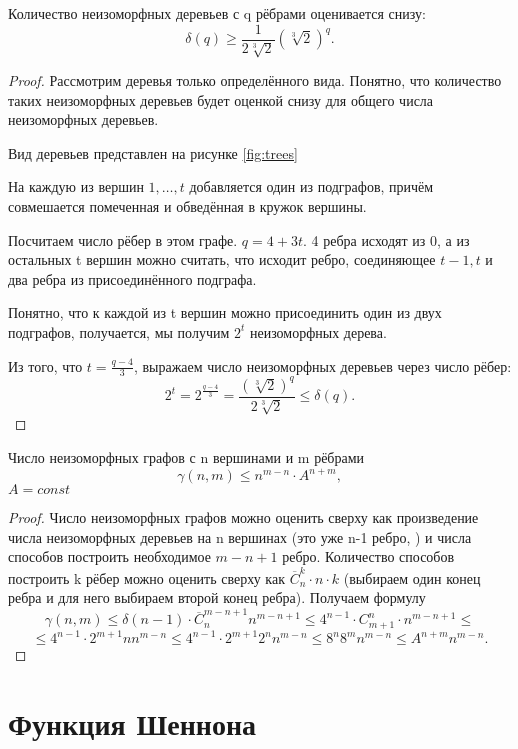 \begin{theorem}
Количество неизоморфных деревьев с q рёбрами оценивается снизу: \[
	\delta(q) \ge \frac{1}{2 \sqrt[3]{2}}\left( \sqrt[3]{2}  \right) ^q
.\] 
\end{theorem}
\begin{proof}
Рассмотрим деревья только определённого вида. Понятно, что количество таких
неизоморфных деревьев будет оценкой снизу для общего числа неизоморфных
деревьев.

Вид деревьев представлен на рисунке \ref{fig:trees}
\begin{figure*}[h!]
    \centering
    \caption{Вид дерева и присоединяемых поддеревьев.}
    \label{fig:trees}
\end{figure*}

На каждую из вершин $1,\ldots, t$ добавляется один из подграфов, причём
совмешается помеченная и обведённая в кружок вершины. 

Посчитаем число рёбер в этом графе. $q=4+3t$. 4 ребра исходят из 0, а из остальных
t вершин можно считать, что исходит ребро, соединяющее  ${t-1, t}$ и два ребра
из присоединённого подграфа.

Понятно, что к каждой из t вершин можно присоединить один из двух подграфов,
получается, мы получим $2^t$ неизоморфных дерева. 

Из того, что $t = \frac{q-4}{3}$, выражаем число неизоморфных деревьев через число рёбер: \[
	2^t = 2^{\frac{q-4}{3}} = \frac{\left( \sqrt[3]{2}  \right)^q
	}{2\sqrt[3]{2} } \le \delta(q)
.\] 
\end{proof}
\begin{theorem}
	Число неизоморфных графов с n вершинами и m рёбрами \[\gamma(n, m) \le n^{m-n} \cdot
	A^{n+m},\] $A=const$
\end{theorem}
\begin{proof}
Число неизоморфных графов можно оценить сверху как произведение числа
неизоморфных деревьев на n вершинах (это уже n-1 ребро, 	) и числа способов
построить необходимое $m-n+1$ ребро. Количество способов построить k рёбер
можно оценить сверху как $\overline{C}_n^k \cdot  n\cdot k$ (выбираем один конец
ребра и для него выбираем второй конец ребра).
Получаем формулу \[
	\gamma(n, m) \le \delta(n-1) \cdot \overline{C}_n^{m-n+1} n^{m-n+1} \le
	4^{n-1}\cdot C_{m+1}^{n}\cdot n^{m-n+1}\le\] 
	\[
		\le 4^{n-1} \cdot 2^{m+1} n n^{m-n}\le4^{n-1} \cdot 2^{m+1} 2^n
		n^{m-n} \le 8^n 8^m n^{m-n} \le A^{n+m} n^{m-n}
	.\] 
\end{proof}
\section{Функция Шеннона}

